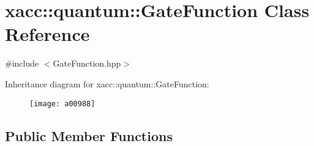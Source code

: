 \hypertarget{a00988}{}\section{xacc\+:\+:quantum\+:\+:Gate\+Function Class Reference}
\label{a00988}


{\ttfamily \#include $<$Gate\+Function.\+hpp$>$}

Inheritance diagram for xacc\+:\+:quantum\+:\+:Gate\+Function\+:\begin{figure}[H]
\begin{center}
\leavevmode
\texttt{[image: a00988]}
\end{center}
\end{figure}
\subsection*{Public Member Functions}
